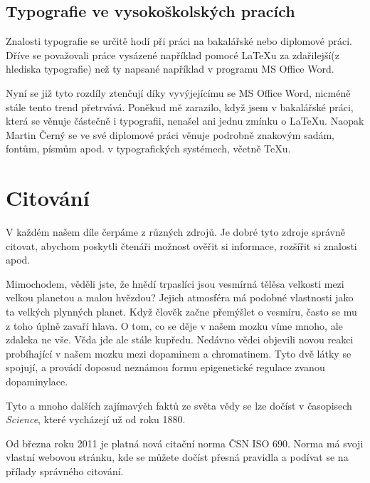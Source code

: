 \documentclass[a4paper, 11pt]{article}
\begin{document}
\subsection{Typografie ve vysokoškolských pracích}
Znalosti typografie se určitě hodí při práci na bakalářské nebo diplomové práci. Dříve se považovali práce vysázené například pomocé \LaTeX u za zdařilejší(z hlediska typografie) než ty napsané například v programu MS Office Word.

Nyní se již tyto rozdíly ztenčují díky vyvýjejícímu se MS Office Word, nicméně stále tento trend přetrvává. Poněkud mě zarazilo, když jsem v bakalářské práci\cite{EliskaCvingrafova2011}, která se věnuje částečně i typografii, nenašel ani jednu zmínku o \LaTeX u. Naopak Martin Černý se ve své diplomové práci věnuje podrobně znakovým sadám, fontům, písmům apod. v typografických systémech, včetně \TeX u.\cite{MartinCerny1999}

\section{Citování}
V každém našem díle čerpáme z různých zdrojů. Je dobré tyto zdroje správně citovat, abychom poskytli čtenáři možnost ověřit si informace, rozšířit si znalosti apod.

Mimochodem, věděli jste, že hnědí trpaslíci jsou vesmírná tělěsa velkosti mezi velkou planetou a malou hvězdou? Jejich atmosféra má podobné vlastnosti jako ta velkých plynných planet.\cite{Science1}
Když člověk začne přemýšlet o vesmíru, často se mu z toho úplně zavaří hlava.
O tom, co se děje v našem mozku víme mnoho, ale zdaleka ne vše. Věda jde ale stále kupředu.
Nedávno vědci objevili novou reakci probíhající v našem mozku mezi dopaminem a chromatinem. Tyto dvě látky se spojují, a provádí doposud neznámou formu epigenetické regulace zvanou dopaminylace.\cite{Science2}

Tyto a mnoho dalších zajímavých faktů ze světa vědy se lze dočíst v časopisech \emph{Science}\cite{ScienceJournal}, které vycházejí už od roku 1880.

Od března roku 2011 je platná nová citační norma ČSN ISO 690. Norma má svoji vlastní webovou stránku, kde se můžete dočíst přesná pravidla a podívat se na přílady správného citování.\cite{csniso690}

\newpage


\end{document}
